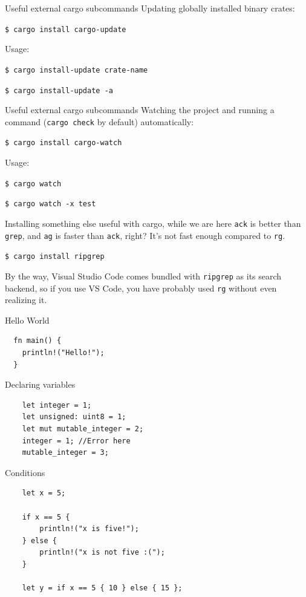 \documentclass[12pt, aspectratio=169]{beamer}
\begin{document}
\begin{frame}{Useful external cargo subcommands}
  Updating globally installed binary crates:

  \texttt{\$ cargo install cargo-update}

  Usage:

  \texttt{\$ cargo install-update crate-name}

  \texttt{\$ cargo install-update -a}
\end{frame}

\begin{frame}{Useful external cargo subcommands}
  Watching the project and running a command (\texttt{cargo check} by default)
  automatically:

  \texttt{\$ cargo install cargo-watch}

  Usage:

  \texttt{\$ cargo watch}

  \texttt{\$ cargo watch -x test}
\end{frame}

\begin{frame}{Installing something else useful with cargo, while we are here}
  \texttt{ack} is better than \texttt{grep}, and \texttt{ag} is faster than
  \texttt{ack}, right? It's not fast enough compared to \texttt{rg}.

  \texttt{\$ cargo install ripgrep}

  By the way, Visual Studio Code comes bundled with \texttt{ripgrep} as its
  search backend, so if you use VS Code, you have probably used \texttt{rg}
  without even realizing it.
\end{frame}

\begin{frame}[fragile]{Hello World}
  \begin{verbatim}
  fn main() {
    println!("Hello!");
  }
  \end{verbatim}
\end{frame}

\begin{frame}[fragile]{Declaring variables}
  \begin{verbatim}
    let integer = 1;
    let unsigned: uint8 = 1;
    let mut mutable_integer = 2;
    integer = 1; //Error here
    mutable_integer = 3;
  \end{verbatim}
\end{frame}

\begin{frame}[fragile]{Conditions}
  \begin{verbatim}
    let x = 5;

    if x == 5 {
        println!("x is five!");
    } else {
        println!("x is not five :(");
    }

    let y = if x == 5 { 10 } else { 15 };
  \end{verbatim}
\end{frame}
\end{document}

